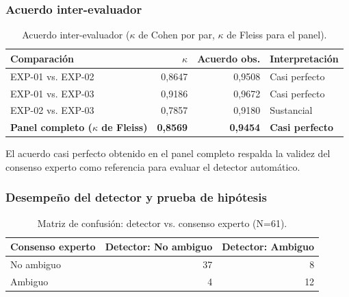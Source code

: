 \documentclass[journal,onecolumn]{IEEEtran}
\begin{document}
\subsubsection{Acuerdo inter-evaluador}

\begin{table}[H]
	\centering
	\caption{Acuerdo inter-evaluador ($\kappa$ de Cohen por par, $\kappa$ de Fleiss para el panel).}
	\label{tab:acuerdo-interevaluador}
	\begin{tabular}{@{}lrrl@{}}
		\toprule
		\textbf{Comparación} & \textbf{$\kappa$} & \textbf{Acuerdo obs.} & \textbf{Interpretación} \\
		\midrule
		EXP-01 vs. EXP-02 & 0,8647 & 0,9508 & Casi perfecto \\
		EXP-01 vs. EXP-03 & 0,9186 & 0,9672 & Casi perfecto \\
		EXP-02 vs. EXP-03 & 0,7857 & 0,9180 & Sustancial \\
		\textbf{Panel completo ($\kappa$ de Fleiss)} & \textbf{0,8569} & \textbf{0,9454} & \textbf{Casi perfecto} \\
		\bottomrule
	\end{tabular}
\end{table}

El acuerdo casi perfecto obtenido en el panel completo respalda la validez
del consenso experto como referencia para evaluar el detector automático.

\subsubsection{Desempeño del detector y prueba de hipótesis}

\begin{table}[H]
	\centering
	\caption{Matriz de confusión: detector vs. consenso experto (N=61).}
	\label{tab:confusion-detector}
	\begin{tabular}{@{}lrr@{}}
		\toprule
		\textbf{Consenso experto} & \textbf{Detector: No ambiguo} & \textbf{Detector: Ambiguo} \\
		\midrule
		No ambiguo & 37 & 8 \\
		Ambiguo & 4 & 12 \\
		\bottomrule
	\end{tabular}
\end{table}
\end{document}
